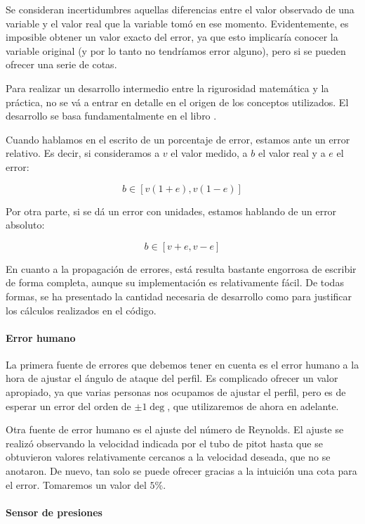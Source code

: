 \documentclass{article}
\begin{document}
Se consideran incertidumbres aquellas diferencias entre el valor observado de una variable y el valor real que la variable 
tomó en ese momento. Evidentemente, es imposible obtener un valor exacto del error, ya que esto implicaría
conocer la variable original (y por lo tanto no tendríamos error alguno), pero si se pueden ofrecer una serie de cotas.

Para realizar un desarrollo intermedio entre la rigurosidad matemática y la práctica, no se vá a entrar en detalle
en el origen de los conceptos utilizados. El desarrollo se basa fundamentalmente en el libro \cite{errores}.

Cuando hablamos en el escrito de un porcentaje de error, estamos ante un error relativo. 
Es decir, si consideramos a $v$ el valor medido, a $b$ el valor real y a $e$ el error:

$$b \in [v (1 + e), v (1 - e)]$$

Por otra parte, si se dá un error con unidades, estamos hablando de un error absoluto:

$$b \in [v + e, v - e]$$

En cuanto a la propagación de errores, está resulta bastante engorrosa de escribir de forma completa,
aunque su implementación es relativamente fácil. De todas formas, se ha presentado la cantidad necesaria de 
desarrollo como para justificar los cálculos realizados en el código.

\paragraph{Error humano}
La primera fuente de errores que debemos tener en cuenta es el error humano a la hora de ajustar el ángulo de 
ataque del perfil. Es complicado ofrecer un valor apropiado, ya que varias personas nos ocupamos de ajustar el perfil, 
pero es de esperar un error del orden de $\pm 1\deg$, que utilizaremos de ahora en adelante.

Otra fuente de error humano es el ajuste del número de Reynolds. El ajuste se realizó observando la velocidad indicada 
por el tubo de pitot hasta que se obtuvieron valores relativamente cercanos a la velocidad deseada, que no se anotaron.
De nuevo, tan solo se puede ofrecer gracias a la intuición una cota para el error. Tomaremos un valor del $5\%$.

\paragraph{Sensor de presiones}
\end{document}
